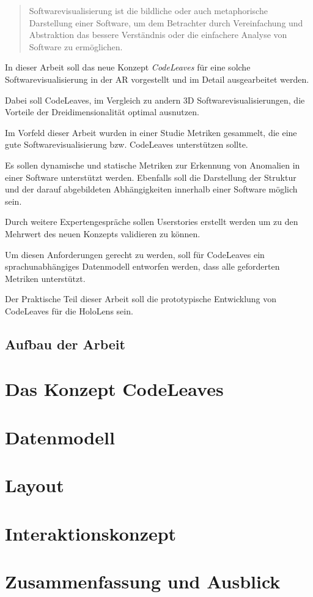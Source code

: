 \begin{quotation}
Softwarevisualisierung ist die bildliche oder auch metaphorische Darstellung einer Software, um dem Betrachter durch Vereinfachung und Abstraktion das bessere Verständnis oder die einfachere Analyse von Software zu ermöglichen.
\end{quotation}

In dieser Arbeit soll das neue Konzept \emph{CodeLeaves} für eine solche Softwarevisualisierung in der AR vorgestellt und im Detail ausgearbeitet werden.

Dabei soll CodeLeaves, im Vergleich zu andern 3D Softwarevisualisierungen, die Vorteile der Dreidimensionalität optimal ausnutzen.

Im Vorfeld dieser Arbeit wurden in einer Studie Metriken gesammelt, die eine gute Softwarevisualisierung bzw. CodeLeaves unterstützen sollte.

Es sollen dynamische und statische Metriken zur Erkennung von Anomalien in einer Software unterstützt werden. Ebenfalls soll die Darstellung der Struktur und der darauf abgebildeten Abhängigkeiten innerhalb einer Software möglich sein.

Durch weitere Expertengespräche sollen Userstories erstellt werden um zu den Mehrwert des neuen Konzepts validieren zu können.

Um diesen Anforderungen gerecht zu werden, soll für CodeLeaves ein sprachunabhängiges Datenmodell entworfen werden, dass alle geforderten Metriken unterstützt.

Der Praktische Teil dieser Arbeit soll die prototypische Entwicklung von CodeLeaves für die HoloLens sein.

\section{Aufbau der Arbeit}

\chapter{Das Konzept CodeLeaves}
\chapter{Datenmodell}
\chapter{Layout}
\chapter{Interaktionskonzept}
\chapter{Zusammenfassung und Ausblick}
